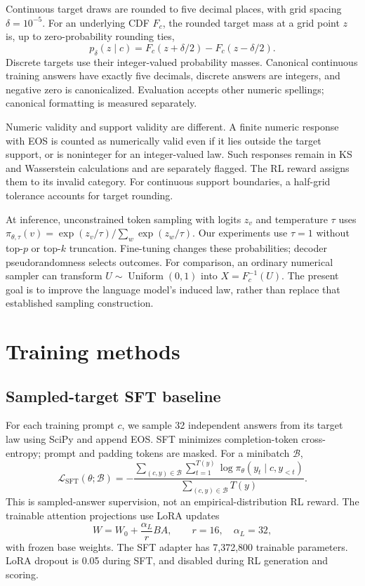 \documentclass[11pt,letterpaper]{article}
\begin{document}
Continuous target draws are rounded to five decimal places, with grid spacing
$\delta=10^{-5}$. For an underlying CDF $F_c$, the rounded target mass at a
grid point $z$ is, up to zero-probability rounding ties,
\begin{equation}
 p_\delta(z\mid c)=F_c(z+\delta/2)-F_c(z-\delta/2).
 \label{eq:rounded}
\end{equation}
Discrete targets use their integer-valued probability masses. Canonical
continuous training answers have exactly five decimals, discrete answers are
integers, and negative zero is canonicalized. Evaluation accepts other numeric
spellings; canonical formatting is measured separately.

Numeric validity and support validity are different. A finite numeric response
with EOS is counted as numerically valid even if it lies outside the target
support, or is noninteger for an integer-valued law. Such responses remain in
KS and Wasserstein calculations and are separately flagged. The RL reward
assigns them to its invalid category. For continuous support boundaries, a
half-grid tolerance accounts for target rounding.

At inference, unconstrained token sampling with logits $z_v$ and temperature
$\tau$ uses $\pi_{\theta,\tau}(v)=\exp(z_v/\tau)/\sum_w\exp(z_w/\tau)$.
Our experiments use $\tau=1$ without top-$p$ or top-$k$ truncation. Fine-tuning
changes these probabilities; decoder pseudorandomness selects outcomes.
For comparison, an ordinary numerical sampler can transform
$U\sim\operatorname{Uniform}(0,1)$ into $X=F_c^{-1}(U)$. The present goal is
to improve the language model's induced law, rather than replace that
established sampling construction.

\section{Training methods}
\subsection{Sampled-target SFT baseline}
For each training prompt $c$, we sample 32 independent answers from its target
law using SciPy and append EOS. SFT minimizes completion-token cross-entropy;
prompt and padding tokens are masked. For a minibatch $\mathcal B$,
\begin{equation}
 \mathcal L_{\mathrm{SFT}}(\theta;\mathcal B)=
 -\frac{\sum_{(c,y)\in\mathcal B}\sum_{t=1}^{T(y)}
   \log\pi_\theta(y_t\mid c,y_{<t})}
 {\sum_{(c,y)\in\mathcal B}T(y)}.
 \label{eq:sft}
\end{equation}
This is sampled-answer supervision, not an empirical-distribution RL reward.
The trainable attention projections use LoRA updates
\begin{equation}
 W=W_0+\frac{\alpha_L}{r}BA,
 \qquad r=16,\quad \alpha_L=32,
 \label{eq:lora}
\end{equation}
with frozen base weights. The SFT adapter has 7,372,800 trainable parameters.
LoRA dropout is 0.05 during SFT, and disabled during RL generation and scoring.
\end{document}
